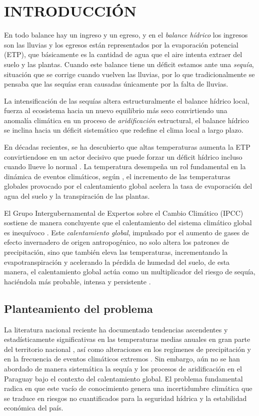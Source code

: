 \chapter{INTRODUCCIÓN}

En todo balance hay un ingreso y un egreso, y en el \textit{balance hídrico} los ingresos son las lluvias y los egresos están representados por la evaporación potencial (ETP), que básicamente es la cantidad de agua que el aire intenta extraer del suelo y las plantas. Cuando este balance tiene un déficit estamos ante una \textit{sequía}, situación que se corrige cuando vuelven las lluvias, por lo que tradicionalmente se pensaba que las sequías eran causadas únicamente por la falta de lluvias. 

La intensificación de las sequías altera estructuralmente el balance hídrico local, fuerza al ecosistema hacia un nuevo equilibrio más seco convirtiendo una anomalía climática en un proceso de \textit{aridificación} estructural, el balance hídrico se inclina hacia un déficit sistemático que redefine el clima local a largo plazo.

En décadas recientes, se ha descubierto que altas temperaturas aumenta la ETP convirtiendose en un actor decisivo que puede forzar un déficit hídrico incluso cuando llueve lo normal \cite{vicenteserrano2010}. La temperatura desempeña un rol fundamental en la dinámica de eventos climáticos, según , el incremento de las temperaturas globales provocado por el calentamiento global acelera la tasa de evaporación del agua del suelo y la transpiración de las plantas.

El Grupo Intergubernamental de Expertos sobre el Cambio Climático (IPCC) sostiene de manera concluyente que el calentamiento del sistema climático global es inequívoco \cite{stocker_climate_2013}. Este \textit{calentamiento global}, impulsado por el aumento de gases de efecto invernadero de origen antropogénico, no solo altera los patrones de precipitación, sino que también eleva las temperaturas, incrementando la evapotranspiración y acelerando la pérdida de humedad del suelo, de esta manera, el calentamiento global actúa como un multiplicador del riesgo de sequía, haciéndola más probable, intensa y persistente \cite{massondelmotte2021}.

\section{Planteamiento del problema}

La literatura nacional reciente ha documentado tendencias ascendentes y estadísticamente significativas en las temperaturas medias anuales en gran parte del territorio nacional \cite{chavez2023}, así como alteraciones en los regímenes de precipitación y en la frecuencia de eventos climáticos extremos \cite{chavez2023, grassi2020}. Sin embargo, aún no se han abordado de manera sistemática la sequía y los procesos de aridificación en el Paraguay bajo el contexto del calentamiento global. El problema fundamental radica en que este vacío de conocimiento genera una incertidumbre climática que se traduce en riesgos no cuantificados para la seguridad hídrica y la estabilidad económica del país.

